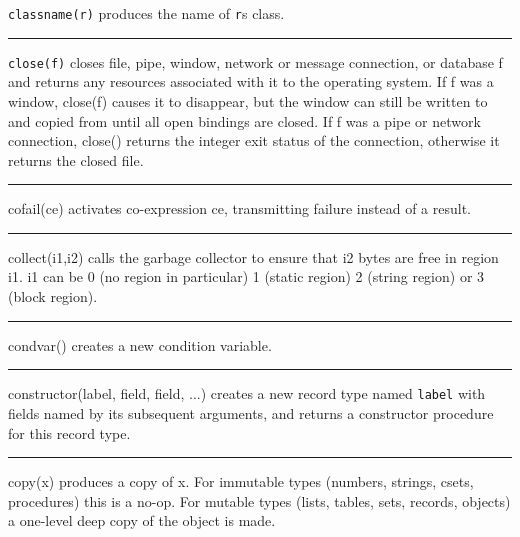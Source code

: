 \noindent
\texttt{classname(r)} produces the name of \texttt{r}{\textquotesingle}s
class.

\bigskip\hrule\vspace{0.1cm}

\noindent
{}\texttt{close(f)} closes file, pipe,
window, network or message connection, or database f
and returns any resources associated with it to the operating system.
If f was a window, close(f) causes it to disappear, but the window can
still be written to and copied from until all open bindings are closed.
If f was a pipe or network connection, close() returns the integer exit
status of the connection, otherwise it returns the closed file.

\bigskip\hrule\vspace{0.1cm}

\noindent
{}cofail(ce) activates
co-expression ce, transmitting failure instead of a result.

\bigskip\hrule\vspace{0.1cm}

\noindent
{}collect(i1,i2) calls the garbage collector to ensure that i2 bytes are free in region
i1. i1 can be 0 (no region in particular) 1 (static region) 2 (string
region) or 3 (block region).

\bigskip\hrule\vspace{0.1cm}

\noindent
{}condvar() creates
a new condition variable.

\bigskip\hrule\vspace{0.1cm}

\noindent
{}constructor(label, field, field, ...) creates
a new record type named \texttt{label} with fields named by its
subsequent arguments, and returns a constructor procedure for this
record type.

\bigskip\hrule\vspace{0.1cm}

\noindent
{}copy(x) produces a copy of x. For immutable types
(numbers, strings, csets, procedures) this is a no-op. For mutable
types (lists, tables, sets, records, objects) a one-level deep copy of
the object is made.

